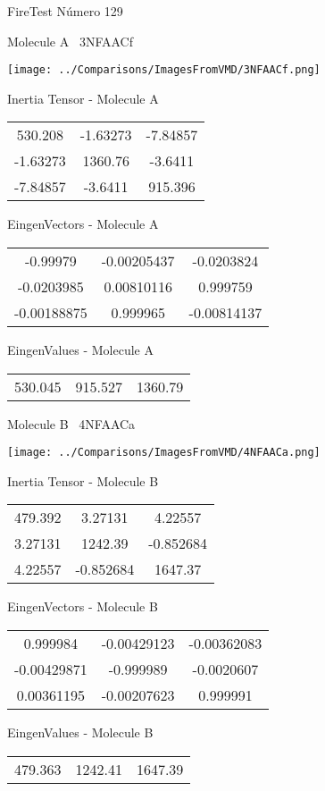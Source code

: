 \vtab[-3cm]
\begin{center}
{\large FireTest \tab Número 129}
\end{center}
\begin{multicols}{2}
\begin{center}

Molecule A \
3NFAACf

\texttt{[image: ../Comparisons/ImagesFromVMD/3NFAACf.png]}

Inertia Tensor - Molecule A \\
\begin{tabular}{|c c c|}
530.208	 & 	-1.63273	 & 	-7.84857	 \\
-1.63273	 & 	1360.76	 & 	-3.6411	 \\
-7.84857	 & 	-3.6411	 & 	915.396
\end{tabular}

\vtab
 EingenVectors - Molecule A     \\
\begin{tabular}{|c c c|}
-0.99979	 & 	-0.00205437	 & 	-0.0203824	 \\
-0.0203985	 & 	0.00810116	 & 	0.999759	 \\
-0.00188875	 & 	0.999965	 & 	-0.00814137
\end{tabular}

\vtab
 EingenValues - Molecule A     \\
\begin{tabular}{|c c c|}
530.045	 & 	915.527	 & 	1360.79	 \\
\end{tabular}
\columnbreak

Molecule B \
4NFAACa

\texttt{[image: ../Comparisons/ImagesFromVMD/4NFAACa.png]}

Inertia Tensor - Molecule B \\
\begin{tabular}{|c c c|}
479.392	 & 	3.27131	 & 	4.22557	 \\
3.27131	 & 	1242.39	 & 	-0.852684	 \\
4.22557	 & 	-0.852684	 & 	1647.37
\end{tabular}

\vtab
 EingenVectors - Molecule B     \\
\begin{tabular}{|c c c|}
0.999984	 & 	-0.00429123	 & 	-0.00362083	 \\
-0.00429871	 & 	-0.999989	 & 	-0.0020607	 \\
0.00361195	 & 	-0.00207623	 & 	0.999991
\end{tabular}

\vtab
 EingenValues - Molecule B     \\
\begin{tabular}{|c c c|}
479.363	 & 	1242.41	 & 	1647.39	 \\
\end{tabular}

\end{center}
\end{multicols}

